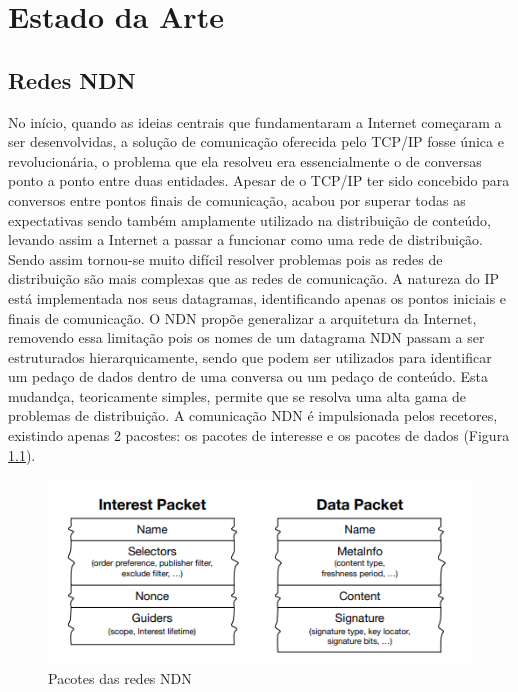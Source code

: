 
%


\chapter{Estado da Arte}
\label{cha:estado_da_arte}



\section{Redes NDN}
\label{sec:redes_NDN}
No início, quando as ideias centrais que fundamentaram a Internet começaram a ser desenvolvidas, a solução de comunicação oferecida pelo TCP/IP fosse única e revolucionária, o problema que ela resolveu era essencialmente o de conversas ponto a ponto entre duas entidades. Apesar de o TCP/IP ter sido concebido para conversos entre pontos finais de comunicação, acabou por superar todas as expectativas sendo também amplamente utilizado na distribuição de conteúdo, levando assim a Internet a passar a funcionar como uma rede de distribuição. Sendo assim tornou-se muito difícil resolver problemas pois as redes de distribuição são mais complexas que as redes de comunicação. A natureza do IP está implementada nos seus datagramas, identificando apenas os pontos iniciais e finais de comunicação. O \gls{NDN} propõe generalizar a arquitetura da Internet, removendo essa limitação pois os nomes de um datagrama \gls{NDN} passam a ser estruturados hierarquicamente, sendo que podem ser utilizados para identificar um pedaço de dados dentro de uma conversa ou um pedaço de conteúdo. Esta mudandça, teoricamente simples, permite que se resolva uma alta gama de problemas de distribuição. A comunicação \gls{NDN} é impulsionada pelos recetores, existindo apenas 2 pacostes: os pacotes de interesse e os pacotes de dados (Figura \ref{fig:Packets}).
\begin{figure}[h]
    \centering
    \includegraphics{Chapters/Figures/Packets.png}
    \caption{Pacotes das redes \gls{NDN} \cite{papadopoulos_lixia_2014}}
    \label{fig:Packets}
\end{figure}
